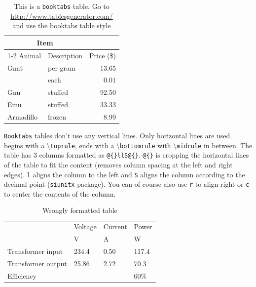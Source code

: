 \begin{table}[H]
\centering
\caption{This is a \texttt{booktabs} table. Go to \url{http://www.tablesgenerator.com/} and use the booktabs table style}
\label{tab:tableExample}
\begin{tabular}{@{}llr@{}}
\toprule
\multicolumn{2}{c}{Item} &            \\ \cmidrule(r){1-2}
Animal     & Description & Price (\$) \\ \midrule
Gnat       & per gram    & 13.65      \\
& each        & 0.01       \\
Gnu        & stuffed     & 92.50      \\
Emu        & stuffed     & 33.33      \\
Armadillo  & frozen      & 8.99       \\ \bottomrule
\end{tabular}
\end{table}
\texttt{Booktabs} tables don't use any vertical lines. Only horizontal lines are used.  begins with a \textbackslash \texttt{toprule}, ends with a \textbackslash \texttt{bottomrule} with \textbackslash \texttt{midrule} in between. The table has 3 columns formatted as \texttt{@\{\}llS@\{\}}. \texttt{@\{\}} is cropping the horizontal lines of the table to fit the content (removes column spacing at the left and right edges). \texttt{l} aligns the column to the left and \texttt{S} aligns the column according to the decimal point (\texttt{siunitx} package). You can of course also use \texttt{r} to align right or \texttt{c} to center the contents of the column.

\begin{table}[H]
\centering
\caption{Wrongly formatted table}
\label{tab:tableExampleWrong}
\begin{tabular}{llll}
\toprule
& Voltage & Current   & Power   \\
& V       & A         & W       \\ \midrule
Transformer input   & 234.4   & 0.50      & 117.4   \\ \midrule
Transformer output  & 25.86   & 2.72      & 70.3    \\ \midrule
Efficiency          &         &           & 60\%    \\ \bottomrule
\end{tabular}
\end{table}

